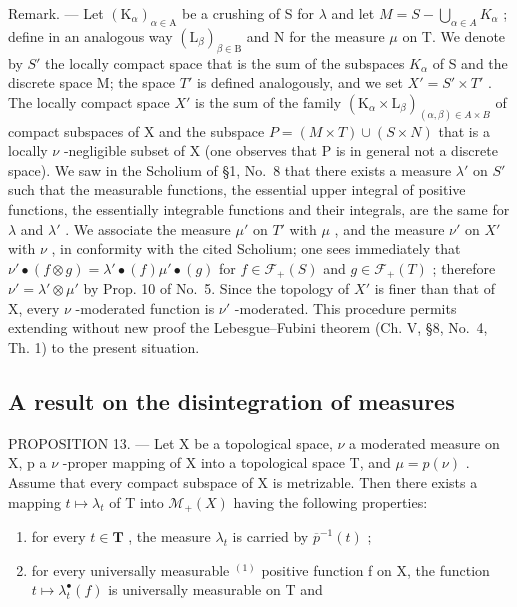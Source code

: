 Remark. --- Let \((\mathrm{K}_{\alpha})_{\alpha\in\mathrm{A}}\) be a crushing of S for \(\lambda\) and let \(M = S - \bigcup_{\alpha\in A} K_{\alpha}\) ; define in an analogous way \((\mathrm{L}_{\beta})_{\beta\in\mathrm{B}}\) and N for the measure \(\mu\) on T. We denote by \(S'\) the locally compact space that is the sum of the subspaces \(K_{\alpha}\) of S and the discrete space M; the space \(T'\) is defined analogously, and we set \(X' = S' \times T'\) . The locally compact space \(X'\) is the sum of the family \((\mathrm{K}_{\alpha} \times \mathrm{L}_{\beta})_{(\alpha,\beta)\in A\times B}\) of compact subspaces of X and the subspace \(P = (M \times T) \cup (S \times N)\) that is a locally \(\nu\) -negligible subset of X (one observes that P is in general not a discrete space). We saw in the Scholium of §1, No.~8 that there exists a measure \(\lambda'\) on \(S'\) such that the measurable functions, the essential upper integral of positive functions, the essentially integrable functions and their integrals, are the same for \(\lambda\) and \(\lambda'\) . We associate the measure \(\mu'\) on \(T'\) with \(\mu\) , and the measure \(\nu'\) on \(X'\) with \(\nu\) , in conformity with the cited Scholium; one sees immediately that \(\nu'\bullet(f \otimes g) = \lambda'\bullet(f)\mu'\bullet(g)\) for \(f \in \mathcal{F}_{+}(S)\) and \(g \in \mathcal{F}_{+}(T)\) ; therefore \(\nu' = \lambda' \otimes \mu'\) by Prop. 10 of No.~5. Since the topology of \(X'\) is finer than that of X, every \(\nu\) -moderated function is \(\nu'\) -moderated. This procedure permits extending without new proof the Lebesgue--Fubini theorem (Ch. V, §8, No.~4, Th. 1) to the present situation.

\subsection{A result on the disintegration of measures}

PROPOSITION 13. --- Let X be a topological space, \(\nu\) a moderated measure on X, p a \(\nu\) -proper mapping of X into a topological space T, and \(\mu = p(\nu)\) . Assume that every compact subspace of X is metrizable. Then there exists a mapping \(t \mapsto \lambda_{t}\) of T into \(\mathcal{M}_{+}(X)\) having the following properties:

\begin{enumerate}
\def\labelenumi{\alph{enumi})}
\item
  for every \(t \in \mathbf{T}\) , the measure \(\lambda_t\) is carried by \(\overline{p}^{-1}(t)\) ;
\item
  for every universally measurable \(^{(1)}\) positive function f on X, the function \(t \mapsto \lambda_{t}^{\bullet}(f)\) is universally measurable on T and
\end{enumerate}

